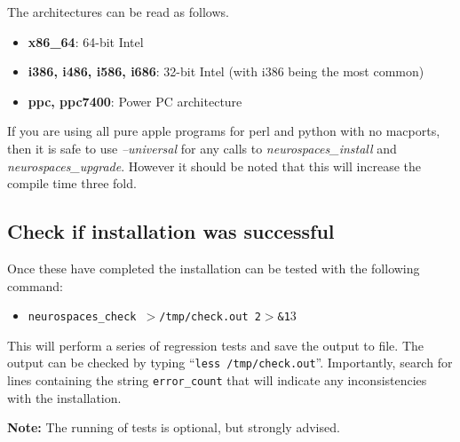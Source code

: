 \documentclass[12pt]{article}
\begin{document}
The architectures can be read as follows.

\begin{itemize}
   \item[] {\bf x86\_64}: 64-bit Intel 
   \item[] {\bf i386, i486, i586, i686}: 32-bit Intel (with i386 being the most common)
   \item[] {\bf ppc, ppc7400}: Power PC architecture
\end{itemize}

If you are using all pure apple programs for perl and python with no macports, then it is safe to use {\it --universal} for any calls to {\it neurospaces\_install} and {\it neurospaces\_upgrade}. However it should be noted that this will increase the compile time three fold.

\subsection*{Check if installation was successful}

Once these have completed the installation can be tested with the following command:
\begin{itemize}
   \item[]{\tt neurospaces\_check $>$/tmp/check.out 2$>$\&1}3
\end{itemize}
This will perform a series of regression tests and save the output to file. The output can be checked by typing ``{\tt less /tmp/check.out}''. Importantly, search for lines containing the string {\tt error\_count} that will indicate any inconsistencies with the installation.

{\bf Note:} The running of tests is optional, but strongly advised.
\end{document}
